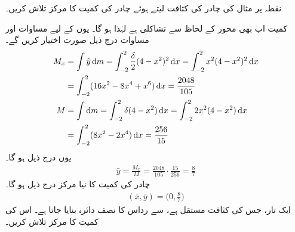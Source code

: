 نقطہ  پر مثال  کی چادر کی کثافت  لیتے ہوئے چادر کی کمیت کا مرکز تلاش کریں۔

کمیت اب بھی محور  کے لحاظ سے تشاکلی ہے لہٰذا  ہو گا۔ یوں  کے لیے مساوات  اور مساوات  درج ذیل صورت اختیار کریں گے۔
\begin{align*}
M_x&=\int\tilde{y}\dif m=\int_{-2}^2\frac{\delta}{2}(4-x^2)^2\dif x=\int_{-2}^2x^2(4-x^2)^2\dif x\\
&=\int_{-2}^2(16x^2-8x^4+x^6)\dif x=\frac{2048}{105}\\
M&=\int\dif m=\int_{-2}^2\delta(4-x^2)\dif x=\int_{-2}^22x^2(4-x^2)\dif x\\
&=\int_{-2}^2(8x^2-2x^4)\dif x=\frac{256}{15}
\end{align*}
یوں درج ذیل ہو گا۔
\begin{align*}
\bar{y}=\frac{M_x}{M}=\frac{2048}{105}\cdot\frac{15}{256}=\frac{8}{7}
\end{align*}
چادر کی کمیت کا نیا مرکز درج ذیل ہو گا۔
\begin{align*}
(\bar{x},\bar{y})=\big(0,\frac{8}{7}\big)
\end{align*}
ایک تار،  جس کی کثافت  مستقل ہے، سے  رداس  کا نصف دائرہ بنایا جاتا ہے۔ اس کی کمیت کا مرکز تلاش کریں۔

